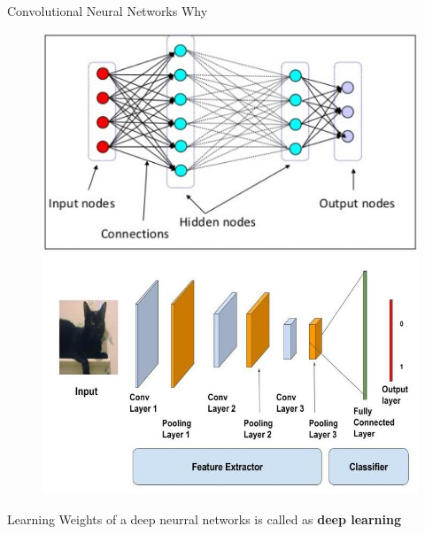 \begin{frame}[fragile]{Convolutional Neural Networks}
    Why \\ 
    \begin{figure}[ht]
      \hspace*{-1cm}\includegraphics[width=0.5\linewidth]{conv1} \\
      \hspace*{-1cm}\includegraphics[width=0.5\linewidth]{conv2}
    \end{figure}
Learning Weights of a deep neurral networks is called as \textbf{deep learning}
\end{frame}


